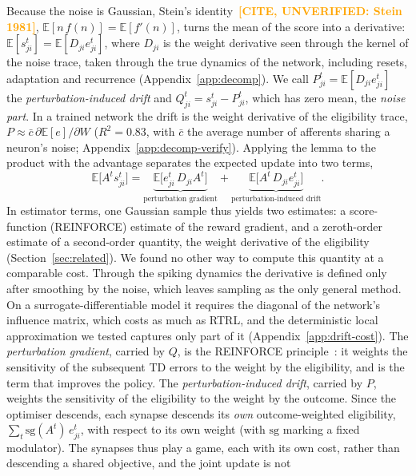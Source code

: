 \documentclass[10pt,twocolumn]{article}
\newcommand{\unverified}[1]{\textcolor{orange}{\bfseries[CITE, UNVERIFIED: #1]}}
\begin{document}
Because the noise is Gaussian, Stein's identity~\unverified{Stein 1981},
$\mathbb{E}[n\,f(n)]=\mathbb{E}[f'(n)]$, turns the mean of the score into a
derivative: $\mathbb{E}[s^t_{ji}]=\mathbb{E}[D_{ji}e^t_{ji}]$, where $D_{ji}$ is
the weight derivative seen through the kernel of the noise trace, taken through the
true dynamics of the network, including resets, adaptation and recurrence
(Appendix~\ref{app:decomp}). We call
$P^t_{ji}=\mathbb{E}[D_{ji}e^t_{ji}]$ the \emph{perturbation-induced drift} and
$Q^t_{ji}=s^t_{ji}-P^t_{ji}$, which has zero mean, the \emph{noise part}. In a
trained network the drift is the weight derivative of the eligibility trace,
$P\approx\bar c\,\partial\mathbb{E}[e]/\partial W$ ($R^2=0.83$, with $\bar c$ the
average number of afferents sharing a neuron's noise;
Appendix~\ref{app:decomp-verify}). Applying the lemma to the product with the
advantage separates the expected update into two terms,
\begin{equation}
\mathbb{E}\big[A^t s^t_{ji}\big]=
\underbrace{\mathbb{E}\big[e^t_{ji}\,D_{ji}A^t\big]}_{\text{perturbation gradient}}
+\underbrace{\mathbb{E}\big[A^t\,D_{ji}e^t_{ji}\big]}_{\text{perturbation-induced drift}} .
\label{eq:two-terms}
\end{equation}
In estimator terms, one Gaussian sample thus yields two estimates: a
score-function (REINFORCE) estimate of the reward gradient, and a zeroth-order
estimate of a second-order quantity, the weight derivative of the eligibility
(Section~\ref{sec:related}). We found no other way to compute this quantity at a
comparable cost. Through the spiking dynamics the derivative is defined only after
smoothing by the noise, which leaves sampling as the only general method. On a
surrogate-differentiable model it requires the diagonal of the network's influence
matrix, which costs as much as RTRL, and the deterministic local
approximation we tested captures only part of it
(Appendix~\ref{app:drift-cost}).
The \emph{perturbation gradient}, carried by $Q$, is the REINFORCE
principle~\citep{Williams1992REINFORCE}: it weights the sensitivity of the
subsequent TD errors to the weight by the eligibility, and is the term that
improves the policy. The \emph{perturbation-induced drift}, carried by $P$, weights
the sensitivity of the eligibility to the weight by the outcome. Since the
optimiser descends, each synapse descends its \emph{own} outcome-weighted eligibility,
$\sum_t\mathrm{sg}(A^t)\,e^t_{ji}$, with respect to its own weight (with
$\mathrm{sg}$ marking a fixed modulator). The synapses thus play a game, each with
its own cost, rather than descending a shared objective, and the joint update is not
\end{document}
